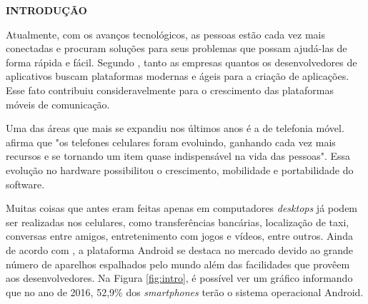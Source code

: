  \vspace{1.2em}
  \textbf{\large INTRODUÇÃO}
  \vspace{2.9em}
\thispagestyle{empty}


	\par Atualmente, com os avanços tecnológicos, as pessoas estão cada vez mais
conectadas e procuram soluções para seus problemas que possam ajudá-las de
forma rápida e fácil.  Segundo , tanto as empresas
quantos os desenvolvedores de aplicativos buscam plataformas modernas e ágeis
para a criação de aplicações. Esse fato contribuiu consideravelmente para o crescimento das
plataformas móveis de comunicação.

	\par Uma das áreas que mais se expandiu nos últimos anos é a de telefonia
móvel.  afirma que "os telefones celulares foram
evoluindo, ganhando cada vez mais recursos e se tornando um item quase
indispensável na vida das pessoas". Essa evolução no hardware possibilitou o
crescimento, mobilidade e portabilidade do software.

	\par Muitas coisas que antes eram feitas apenas em computadores
\textit{desktops} já podem ser realizadas nos celulares, como transferências
bancárias, localização de taxi, conversas entre amigos, entretenimento com
jogos e vídeos, entre outros. Ainda de acordo com , a
plataforma Android se destaca no mercado devido ao grande número de aparelhos
espalhados pelo mundo além das facilidades que provêem aos desenvolvedores. Na
Figura \ref{fig:intro}, é possível ver um gráfico informando que no ano de
2016, 52,9\% dos \textit{smartphones} terão o sistema operacional Android.

